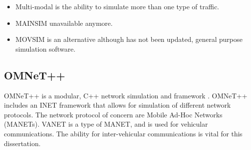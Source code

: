 \begin{table}[H]
\centering
    \caption{Traffic Simulation Software Considerations}
    \label{table:software}
\end{table}

\begin{itemize}
    \item Multi-modal is the ability to simulate more than one type of traffic.
    \item MAINSIM unavailable anymore.
    \item MOVSIM is an alternative although has not been updated, general purpose simulation software.
\end{itemize}


\subsection{OMNeT++} \label{ssec:OMNETT}
OMNeT++ is a modular, C++ network simulation and framework \citep{Varga2008ANENVIRONMENT}. OMNeT++ includes an INET framework that allows for simulation of different network protocols. The network protocol of concern are Mobile Ad-Hoc Networks (MANETs). VANET is a type of MANET, and is used for vehicular communications. The ability for inter-vehicular communications is vital for this dissertation.


